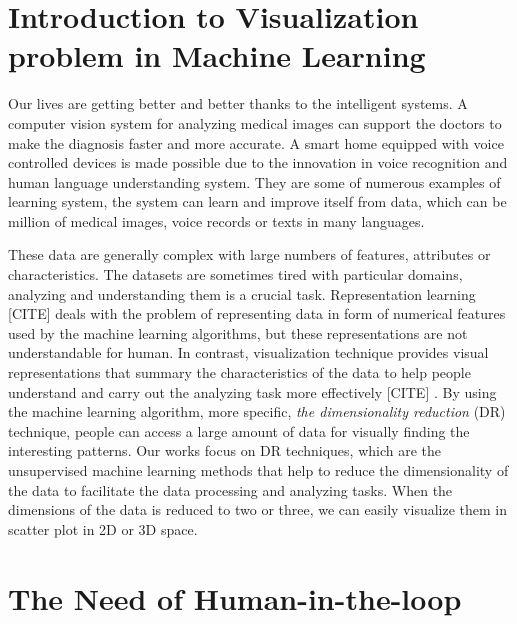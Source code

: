 \section{Introduction to Visualization problem in Machine Learning}

Our lives are getting better and better thanks to the intelligent systems.
A computer vision system for analyzing medical images can support the doctors to make the diagnosis faster and more accurate.
A smart home equipped with voice controlled devices is made possible due to the innovation in voice recognition and human language understanding system.
They are some of numerous examples of learning system, the system can learn and improve itself from data, which can be million of medical images, voice records or texts in many languages.

These data are generally complex with large numbers of features, attributes or characteristics.
The datasets are sometimes tired with particular domains, analyzing and understanding them is a crucial task.
Representation learning [CITE] deals with the problem of representing data in form of numerical features used by the machine learning algorithms, but these representations are not understandable for human.
In contrast, visualization technique provides visual representations that summary the characteristics of the data to help people understand and carry out the analyzing task more effectively [CITE] .
By using the machine learning algorithm, more specific, \emph{the dimensionality reduction} (DR) technique, people can access a large amount of data for visually finding the interesting patterns.
Our works focus on DR techniques, which are the unsupervised machine learning methods that help to reduce the dimensionality of the data to facilitate the data processing and analyzing tasks.
When the dimensions of the data is reduced to two or three, we can easily visualize them in scatter plot in 2D or 3D space.


\section{The Need of Human-in-the-loop}




